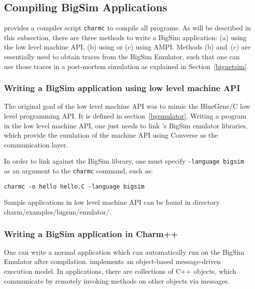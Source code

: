 \subsection{Compiling BigSim Applications}

\charmpp{} provides a compiler script {\tt charmc} to compile all programs.
As will be described in this subsection, there are three methods to write a BigSim application:
(a) using the low level machine API, (b) using \charmpp{} or (c) using AMPI. Methods
(b) and~(c) are essentially used to obtain traces from the BigSim Emulator, such that
one can use those traces in a post-mortem simulation as explained in
Section~\ref{bignetsim}.

\subsubsection{Writing a BigSim application using low level machine API}
        The original goal of the low level machine API was to mimic the BlueGene/C low level programming
API. It is defined in section~\ref{bgemulator}. Writing a program in the 
        low level machine API, one just needs to link \charmpp{}'s BigSim emulator
libraries, which provide the emulation of the machine API using Converse as
the communication layer.

        In order to link against the BigSim library, one must specify 
        \texttt{-language bigsim} as an argument to the {\tt charmc} command, 
        such as:
\begin{verbatim}
charmc -o hello hello.C -language bigsim
\end{verbatim}

        Sample applications in low level machine API can be found in directory
        charm/examples/bigsim/emulator/.

\subsubsection{Writing a BigSim application in Charm++}

One can write a normal \charmpp{} application which can automatically 
        run on the BigSim Emulator after compilation. \charmpp{} implements
an object-based message-driven execution model. In \charmpp{} applications,
there are collections of C++ objects, which communicate by remotely invoking
        methods on other objects via messages.

